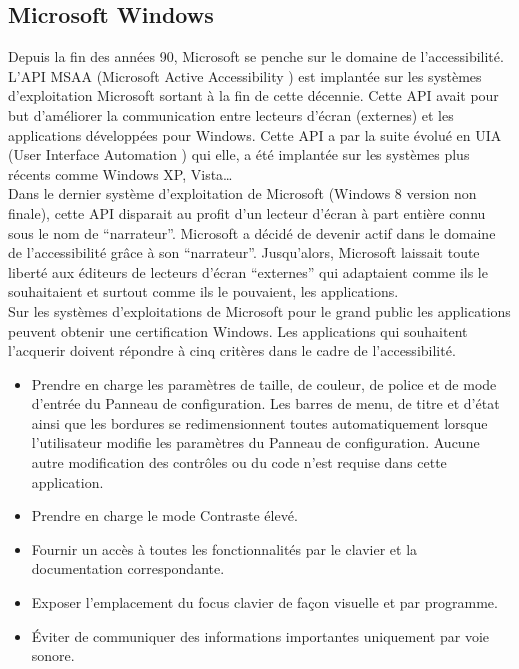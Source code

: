 \documentclass[french,a4paper]{report}
\begin{document}
\subsection{Microsoft Windows}
Depuis la fin des années 90, Microsoft se penche sur le domaine de l'accessibilité. L'API MSAA
(Microsoft Active Accessibility \cite{MSAA}) est implantée sur les systèmes d'exploitation
Microsoft sortant à la fin de cette décennie. Cette API avait pour but d'améliorer la
communication entre lecteurs d'écran (externes) et les applications développées pour Windows.
Cette API a par la suite évolué en UIA (User Interface Automation \cite{UIA}) qui elle, a été
implantée sur les systèmes plus récents comme Windows XP, Vista\dots \\
Dans le dernier système d'exploitation de Microsoft (Windows 8 version non
finale), cette API disparait au profit d'un lecteur d'écran à part entière connu
sous le nom de \enquote{narrateur}. Microsoft a décidé de devenir actif dans le
domaine de l'accessibilité grâce à son \enquote{narrateur}. Jusqu'alors,
Microsoft laissait toute liberté aux éditeurs de lecteurs d'écran
\enquote{externes} qui adaptaient comme ils le souhaitaient et surtout comme ils le pouvaient, les applications.\\
Sur les systèmes d'exploitations de Microsoft pour le grand public les applications peuvent
obtenir une certification Windows. Les applications qui souhaitent l'acquerir
doivent répondre à cinq critères dans le cadre de l'accessibilité.\newline
\begin{itemize}\setlength{\itemsep}{0.4\baselineskip}
\item Prendre en charge les paramètres de taille, de couleur, de police et de mode d'entrée
du Panneau de configuration. Les barres de menu, de titre et d'état ainsi que les bordures
se redimensionnent toutes automatiquement lorsque l'utilisateur modifie les paramètres du
Panneau de configuration. Aucune autre modification des contrôles ou du code n'est requise
dans cette application.
\item Prendre en charge le mode Contraste élevé.
\item Fournir un accès à toutes les fonctionnalités par le clavier et la documentation
correspondante.
\item Exposer l'emplacement du focus clavier de façon visuelle et par programme.
\item Éviter de communiquer des informations importantes uniquement par voie sonore.\\
\end{itemize}
\end{document}
